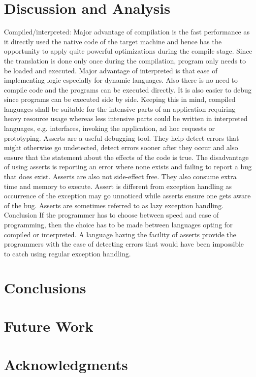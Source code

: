 \documentclass{sig-alternate}
\begin{document}
\section{Discussion and Analysis}
Compiled/interpreted: Major advantage of compilation is the fast performance as it directly used the native code of the target machine and hence has the opportunity to apply quite powerful optimizations during the compile stage. Since the translation is done only once during the compilation, program only needs to be loaded and executed. Major advantage of interpreted is that ease of implementing logic especially for dynamic languages. Also there is no need to compile code and the programs can be executed directly. It is also easier to debug since programs can be executed side by side. Keeping this in mind, compiled languages shall be suitable for the intensive parts of an application requiring heavy resource usage whereas less intensive parts could be written in interpreted languages, e.g. interfaces, invoking the application, ad hoc requests or prototyping.
Asserts are a useful debugging tool. They help detect errors that might otherwise go undetected, detect errors sooner after they occur and also ensure that the statement about the effects of the code is true. The disadvantage of using asserts is reporting an error where none exists and failing to report a bug that does exist. Asserts are also not side-effect free. They also consume extra time and memory to execute. Assert is different from exception handling as occurrence of the exception may go unnoticed while asserts ensure one gets aware of the bug. Asserts are sometimes referred to as lazy exception handling.
Conclusion
If the programmer has to choose between speed and ease of programming, then the choice has to be made between languages opting for compiled or interpreted. A language having the facility of asserts provide the programmers with the ease of detecting errors that would have been impossible to catch using regular exception handling.


\section{Conclusions}

\section{Future Work}

\section{Acknowledgments}
\end{document}
